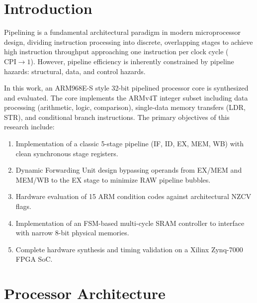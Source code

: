 \documentclass[conference]{IEEEtran}
\begin{document}
\section{Introduction}
Pipelining is a fundamental architectural paradigm in modern microprocessor design, dividing instruction processing into discrete, overlapping stages to achieve high instruction throughput approaching one instruction per clock cycle ($\text{CPI} \to 1$). However, pipeline efficiency is inherently constrained by pipeline hazards: structural, data, and control hazards.

In this work, an ARM968E-S style 32-bit pipelined processor core is synthesized and evaluated. The core implements the ARMv4T integer subset including data processing (arithmetic, logic, comparison), single-data memory transfers (LDR, STR), and conditional branch instructions. The primary objectives of this research include:
\begin{enumerate}
    \item Implementation of a classic 5-stage pipeline (IF, ID, EX, MEM, WB) with clean synchronous stage registers.
    \item Dynamic Forwarding Unit design bypassing operands from EX/MEM and MEM/WB to the EX stage to minimize RAW pipeline bubbles.
    \item Hardware evaluation of 15 ARM condition codes against architectural NZCV flags.
    \item Implementation of an FSM-based multi-cycle SRAM controller to interface with narrow 8-bit physical memories.
    \item Complete hardware synthesis and timing validation on a Xilinx Zynq-7000 FPGA SoC.
\end{enumerate}

\section{Processor Architecture}
\end{document}
